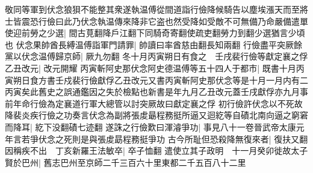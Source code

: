 敬同等軍到伏念狼狽不能整其衆遂執温傅從間道詣行儉降候騎告以塵埃漲天而至將士皆震恐行儉曰此乃伏念執温傳來降非它盗也然受降如受敵不可無備乃命嚴備遣單使迎前勞之少選|{
	間古莧翻降戶江翻下同騎奇寄翻使疏吏翻勞力到翻少選猶言少頃也}
伏念果帥酋長縛温傅詣軍門請罪|{
	帥讀曰率酋慈由翻長知兩翻}
行儉盡平突厥餘黨以伏念温傅歸京師|{
	厥九勿翻}
冬十月丙寅朔日有食之　壬戌裴行儉等獻定襄之俘乙丑改元|{
	改元開耀}
丙寅斬阿史那伏念阿史德温傅等五十四人于都市|{
	既書十月丙寅朔日食方書壬戍裴行儉獻俘乙丑改元又書丙寅斬阿史那伏念等是十月一月内有二丙寅矣此舊史之誤通鑑因之失於檢點也新書是年九月乙丑改元蓋壬戌獻俘亦九月事前年命行儉為定襄道行軍大總管以討突厥故曰獻定襄之俘}
初行儉許伏念以不死故降裴炎疾行儉之功奏言伏念為副將張䖍朂程務挺所逼又迴紇等自磧北南向逼之窮窘而降耳|{
	紇下没翻磧七迹翻}
遂誅之行儉歎曰渾濬爭功|{
	事見八十一卷晉武帝太康元年言若爭伏念之死則是與張䖍勗程務挺爭功}
古今所耻但恐殺降無復來者|{
	復扶又翻}
因稱疾不出　丁亥新羅王法敏卒|{
	卒子恤翻}
遣使立其子政明　十一月癸卯徙故太子賢於巴州|{
	舊志巴州至京師二千三百六十里東都二千五百八十二里}



